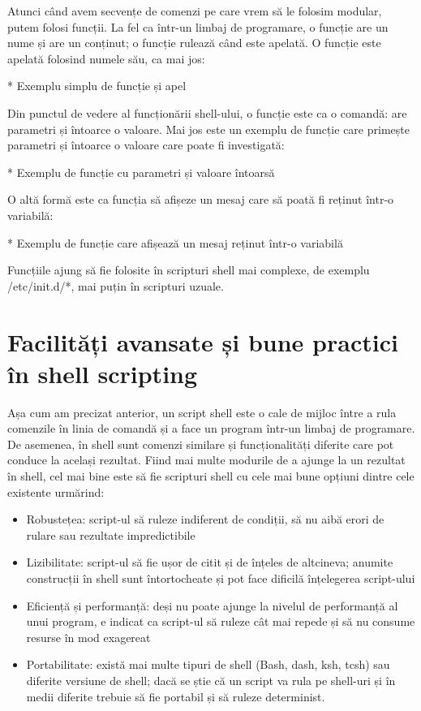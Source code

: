 Atunci când avem secvențe de comenzi pe care vrem să le folosim modular, putem
folosi funcții. La fel ca într-un limbaj de programare, o funcție are un nume și
are un conținut; o funcție rulează când este apelată. O funcție este apelată
folosind numele său, ca mai jos:

* Exemplu simplu de funcție și apel

Din punctul de vedere al funcționării shell-ului, o funcție este ca o comandă:
are parametri și întoarce o valoare. Mai jos este un exemplu de funcție care
primește parametri și întoarce o valoare care poate fi investigată:

* Exemplu de funcție cu parametri și valoare întoarsă

O altă formă este ca funcția să afișeze un mesaj care să poată fi reținut într-o
variabilă:

* Exemplu de funcție care afișează un mesaj reținut într-o variabilă

Funcțiile ajung să fie folosite în scripturi shell mai complexe, de exemplu
/etc/init.d/*, mai puțin în scripturi uzuale.

\section{Facilități avansate și bune practici în shell scripting}
\label{sec:auto-advancedfunc}

Așa cum am precizat anterior, un script shell este o cale de mijloc între a rula
comenzile în linia de comandă și a face un program într-un limbaj de programare.
De asemenea, în shell sunt comenzi similare și funcționalități diferite care pot
conduce la același rezultat. Fiind mai multe modurile de a ajunge la un rezultat
în shell, cel mai bine este să fie scripturi shell cu cele mai bune opțiuni
dintre cele existente urmărind:

\begin{itemize}
	\item Robustețea: script-ul să ruleze indiferent de condiții, să nu aibă
		erori de rulare sau rezultate impredictibile
	\item Lizibilitate: script-ul să fie ușor de citit și de înțeles de
		altcineva; anumite construcții în shell sunt întortocheate și
		pot face dificilă înțelegerea script-ului
	\item Eficiență și performanță: deși nu poate ajunge la nivelul de
		performanță al unui program, e indicat ca script-ul să ruleze
		cât mai repede și să nu consume resurse în mod exagereat
	\item Portabilitate: există mai multe tipuri de shell (Bash, dash, ksh,
		tcsh) sau diferite versiune de shell; dacă se știe că un script
		va rula pe shell-uri și în medii diferite trebuie să fie
		portabil și să ruleze determinist.
\end{itemize}

